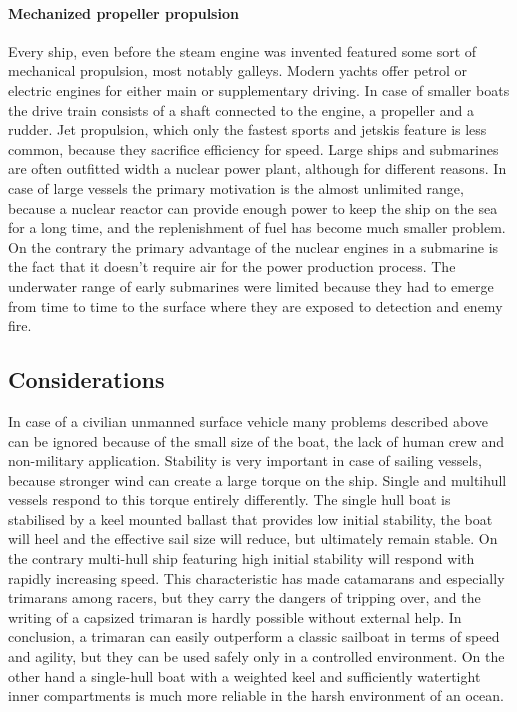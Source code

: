 \paragraph{Mechanized propeller propulsion}

Every ship, even before the steam engine was invented featured some sort of mechanical propulsion, most notably galleys. Modern yachts offer petrol or electric engines for either main or supplementary driving. In case of smaller boats the drive train consists of a shaft connected to the engine, a propeller and a rudder. Jet propulsion, which only the fastest sports and jetskis feature is less common, because they sacrifice efficiency for speed.
Large ships and submarines are often outfitted width a nuclear power plant, although for different reasons. In case of large vessels the primary motivation is the almost unlimited range, because a nuclear reactor can provide enough power to keep the ship on the sea for a long time, and the replenishment of fuel has become much smaller problem. On the contrary the primary advantage of the nuclear engines in a submarine is the fact that it doesn't require air for the power production process. The underwater range of early submarines were limited because they had to emerge from time to time to the surface where they are exposed to detection and enemy fire.

\subsection{Considerations}

In case of a civilian unmanned surface vehicle many problems described above can be ignored because of the small size of the boat, the lack of human crew and non-military application.
Stability is very important in case of sailing vessels, because stronger wind can create a large torque on the ship. Single and multihull vessels respond to this torque entirely differently. The single hull boat is stabilised by a keel mounted ballast that provides low initial stability, the boat will heel and the effective sail size will reduce, but ultimately remain stable. On the contrary multi-hull ship featuring high initial stability will respond with rapidly increasing speed. This characteristic has made catamarans and especially trimarans among racers, but they carry the dangers of tripping over, and the writing of a capsized trimaran is hardly possible without external help. In conclusion, a  trimaran can easily outperform a classic sailboat in terms of speed and agility, but they can be used safely only in a controlled environment. On the other hand a single-hull boat with a weighted keel and sufficiently watertight inner compartments is much more reliable in the harsh environment of an ocean. 